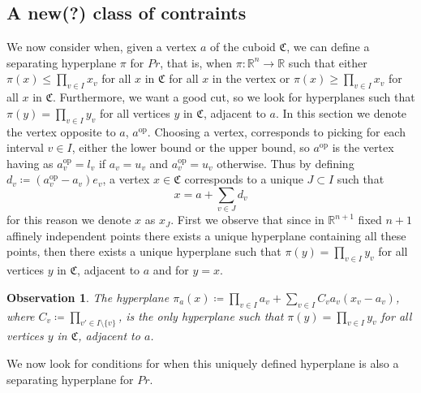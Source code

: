 \documentclass{article}
\newtheorem{observation}[theorem]{Observation}
\begin{document}
\subsection{A new(?) class of contraints}
\newcommand{\aop}{a^{\text{op}}}
\newcommand{\prodset}{Pr}
\newcommand{\pisum}[1]{\prod_{v \in I\setminus{\{#1\}}}a_v (\aop_{#1}-a_{#1})}
We now consider when, given a vertex \(a\) of the cuboid \(\mathfrak{C}\), we can define a separating hyperplane \(\pi\) for \(\prodset\), that is, when \(\pi: \mathbb{R}^n \to \mathbb{R}\)
such that either \(\pi(x) \leq \prod_{v \in I}x_v\) for all \(x\) in \(\mathfrak{C}\) for all \(x\) in the vertex or \(\pi(x) \geq \prod_{v \in I}x_v\)
for all \(x\) in \(\mathfrak{C}\). Furthermore, we want a good cut, so we look for hyperplanes such that \(\pi(y) = \prod_{v \in I}y_v\) for all vertices \(y\) in \(\mathfrak{C}\), adjacent to \(a\). 
%
In this section we denote the vertex opposite to \(a\), \(\aop\). Choosing a vertex, corresponds to picking for each interval \(v \in I\), 
either the lower bound or the upper bound, so \(\aop\) is the vertex having as \(\aop_v = l_v\) if \(a_v = u_v\) and \(\aop_v = u_v\) otherwise.
%
Thus by defining \(d_v \coloneqq (\aop_v - a_v)e_v\), a vertex \(x \in \mathfrak{C}\) corresponds to a unique \(J \subset I\) such that \[x = a + \sum_{v \in J} d_v\]
for this reason we denote \(x\) as \(x_J\).
%
First we observe that since in \(\mathbb{R}^{n+1}\) fixed \(n+1\) affinely independent points there exists a unique hyperplane containing all these points, then there exists a unique hyperplane such that \(\pi(y) = \prod_{v \in I}y_v\) for all vertices \(y\) in \(\mathfrak{C}\), adjacent to \(a\) and for \(y = x\).
\begin{observation}
	The hyperplane \(\pi_a(x) \coloneqq \prod_{v \in I}a_v + \sum_{v \in I} C_v a_v(x_v - a_v)\), where \(C_v \coloneqq \prod_{v' \in I \setminus \{v\}}\), is the only hyperplane such that \(\pi(y) = \prod_{v \in I}y_v\) for all vertices \(y\) in \(\mathfrak{C}\), adjacent to \(a\).
\end{observation}
%
We now look for conditions for when this uniquely defined hyperplane is also a separating hyperplane for \(\prodset\).
%
\newcommand{\prodi}[1]{p(#1)}
\end{document}
